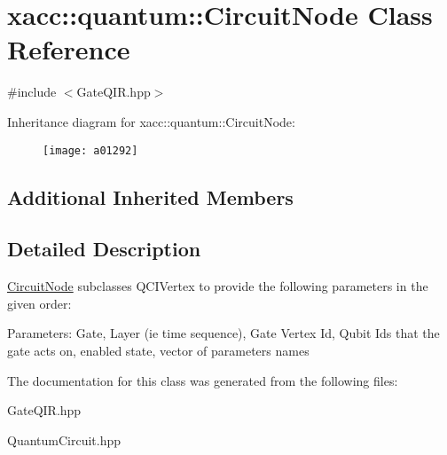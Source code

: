 \hypertarget{a01292}{}\section{xacc\+:\+:quantum\+:\+:Circuit\+Node Class Reference}
\label{a01292}


{\ttfamily \#include $<$Gate\+Q\+I\+R.\+hpp$>$}

Inheritance diagram for xacc\+:\+:quantum\+:\+:Circuit\+Node\+:\begin{figure}[H]
\begin{center}
\leavevmode
\texttt{[image: a01292]}
\end{center}
\end{figure}
\subsection*{Additional Inherited Members}


\subsection{Detailed Description}
\hyperlink{a01292}{Circuit\+Node} subclasses Q\+C\+I\+Vertex to provide the following parameters in the given order\+:

Parameters\+: Gate, Layer (ie time sequence), Gate Vertex Id, Qubit Ids that the gate acts on, enabled state, vector of parameters names 

The documentation for this class was generated from the following files\+:\begin{DoxyCompactItemize}
\item 
Gate\+Q\+I\+R.\+hpp\item 
Quantum\+Circuit.\+hpp\end{DoxyCompactItemize}
